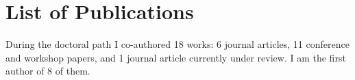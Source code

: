 \documentclass[a4paper,11pt]{article}
\begin{document}
\section{List of Publications}
\label{sec:publications}

During the doctoral path I co-authored 18 works:
6 journal articles, 11 conference and workshop papers, and 1 journal article currently under review.
%
I am the first author of 8 of them.

\nocite{*}
\printbibliography[type=article, heading=subbibliography, title={Journal Articles}]
\printbibliography[type=inproceedings, heading=subbibliography, title={Conference and Workshop Papers}]
\printbibliography[type=unpublished, heading=subbibliography, title={Submitted for Publication}]
\end{document}
